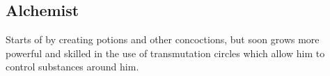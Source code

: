 \documentclass{article}
\begin{document}
\subsection{Alchemist}

Starts of by creating potions and other concoctions, but soon grows more powerful and skilled in the use of transmutation circles which allow him to control substances around him.
\end{document}
